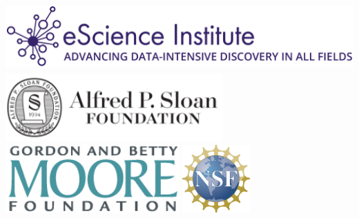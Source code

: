 \documentclass[a0, landscape]{a0poster}
\begin{document}
\begin{multicols}{3}
\includegraphics[height=2.6cm]{eSciencelogo.png}
\includegraphics[height=2.6cm]{SloanLogo.png}
\includegraphics[height=2.6cm]{MooreFdn.png}
\includegraphics[height=2.6cm]{NSFLogo}

\end{multicols}
\end{document}
